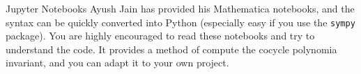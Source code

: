 \documentclass{beamer}
\begin{document}
    \begin{frame}{Jupyter Notebooks}
        Ayush Jain has provided his Mathematica notebooks, and the syntax can
        be quickly converted into Python (especially easy if you use the
        \texttt{sympy} package). You are highly encouraged to read these
        notebooks and try to understand the code. It provides a method of
        compute the cocycle polynomia invariant, and you can adapt it to your
        own project.
    \end{frame}
\end{document}

